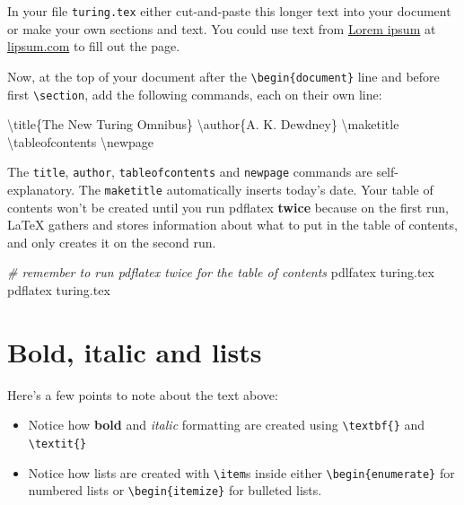 \documentclass[
]{book}
\newenvironment{Shaded}{\begin{snugshade}}{\end{snugshade}}
\newcommand{\CommentTok}[1]{\textcolor[rgb]{0.56,0.35,0.01}{\textit{#1}}}
\newcommand{\FunctionTok}[1]{\textcolor[rgb]{0.00,0.00,0.00}{#1}}
\newcommand{\NormalTok}[1]{#1}
\providecommand{\tightlist}{%
  \setlength{\itemsep}{0pt}\setlength{\parskip}{0pt}}
\begin{document}
In your file \texttt{turing.tex} either cut-and-paste this longer text into your document or make your own sections and text. You could use text from \href{https://en.wikipedia.org/wiki/Lorem_ipsum}{Lorem ipsum} at \href{https://www.lipsum.com}{lipsum.com} to fill out the page.

Now, at the top of your document after the \texttt{\textbackslash{}begin\{document\}} line and before first \texttt{\textbackslash{}section}, add the following commands, each on their own line:

\begin{Shaded}
\begin{Highlighting}[]
\FunctionTok{\textbackslash{}title}\NormalTok{\{The New Turing Omnibus\}}
\FunctionTok{\textbackslash{}author}\NormalTok{\{A. K. Dewdney\}}
\FunctionTok{\textbackslash{}maketitle}
\FunctionTok{\textbackslash{}tableofcontents}
\FunctionTok{\textbackslash{}newpage}
\end{Highlighting}
\end{Shaded}

The \texttt{title}, \texttt{author}, \texttt{tableofcontents} and \texttt{newpage} commands are self-explanatory. The \texttt{maketitle} automatically inserts today's date. Your table of contents won't be created until you run pdflatex \textbf{twice} because on the first run, LaTeX gathers and stores information about what to put in the table of contents, and only creates it on the second run.

\begin{Shaded}
\begin{Highlighting}[]
\CommentTok{\# remember to run pdflatex twice for the table of contents}
\NormalTok{pdlfatex turing.tex}
\NormalTok{pdflatex turing.tex}
\end{Highlighting}
\end{Shaded}

\hypertarget{bold-italic-and-lists}{%
\section{Bold, italic and lists}\label{bold-italic-and-lists}}

Here's a few points to note about the text above:

\begin{itemize}
\tightlist
\item
  Notice how \textbf{bold} and \emph{italic} formatting are created using \texttt{\textbackslash{}textbf\{\}} and \texttt{\textbackslash{}textit\{\}}
\item
  Notice how lists are created with \texttt{\textbackslash{}item}s inside either \texttt{\textbackslash{}begin\{enumerate\}} for numbered lists or \texttt{\textbackslash{}begin\{itemize\}} for bulleted lists.
\end{itemize}
\end{document}

